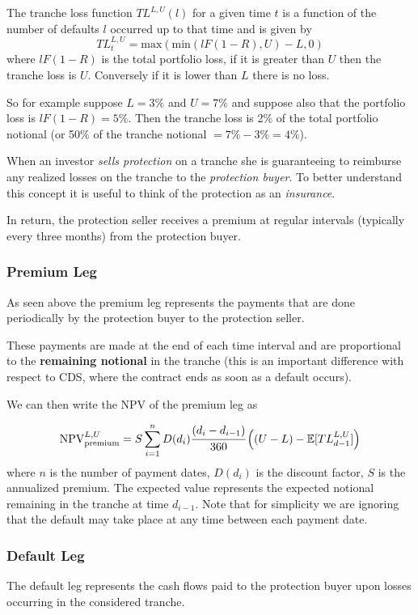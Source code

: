 The tranche loss function $TL^{L,U}(l)$ for a given time $t$ is a function of the number of defaults $l$ occurred up to that time and is given by
\begin{equation*}
TL_{t}^{L,U}=\mathrm{max}(\mathrm{min}(lF(1-R), U)-L, 0)
\end{equation*}
where $lF(1-R)$ is the total portfolio loss, if it is greater than $U$ then the tranche loss is $U$. Conversely if it is lower than $L$ there is no loss.

So for example suppose $L=3\%$ and $U=7\%$ and suppose also that the portfolio loss is $lF(1-R)=5\%$. Then the tranche loss is 2\% of the total portfolio notional (or 50\% of the tranche notional $=7\%-3\%=4\%$).

When an investor \emph{sells protection} on a tranche she is guaranteeing to reimburse any realized losses on the tranche to the \emph{protection buyer}. To better understand this concept it is useful to think of the protection as an \emph{insurance}. 

In return, the protection seller receives a premium at regular intervals (typically every three months) from the protection buyer.

\subsubsection{Premium Leg}
As seen above the premium leg represents the payments that are done periodically by the protection buyer to the protection seller.

These payments are made at the end of each time interval and are proportional to the \textbf{remaining notional} in the tranche (this is an important difference with respect to CDS, where the contract ends as soon as a default occurs).

We can then write the NPV of the premium leg as

\begin{equation}
\mathrm{NPV}_{\mathrm{premium}}^{L,U}=S\sum^{n}_{i=1}D(d_i)\cfrac{(d_i - d_{i-1})}{360}\left((U-L)-\mathbb{E}[TL_{d-1}^{L,U}]\right)
\label{eq:cdo_npv_premium}
\end{equation}
where $n$ is the number of payment dates, $D(d_i)$ is the discount factor, $S$ is the annualized premium. The expected value represents the expected notional remaining in the tranche at time 
$d_{i-1}$.
Note that for simplicity we are ignoring that the default may take place at any time between each payment date.

\subsubsection{Default Leg}
The default leg represents the cash flows paid to the protection buyer upon losses occurring in the considered tranche. 

